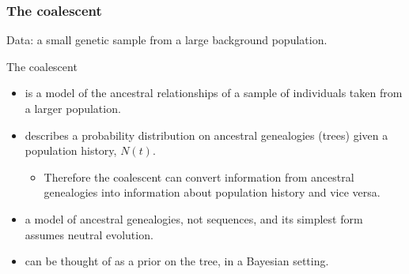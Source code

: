 
\begin{frame}
\frametitle{The coalescent}

Data: a \alert{small genetic sample} from a \alert{large background population}.

\smallskip 
\alert{The coalescent }
\begin{itemize}
\item is a model of the ancestral relationships of a sample of individuals taken from a larger population.
\smallskip
\item describes a probability distribution on ancestral genealogies (trees) given a population history, $N(t)$. 
  \begin{itemize}
	\item Therefore the coalescent can convert information from ancestral genealogies into information about population history and vice versa.
  \end{itemize}
\smallskip
\item a model of ancestral genealogies, not sequences, and its simplest form assumes neutral evolution.
\smallskip
\item can be thought of as a prior on the tree, in a Bayesian setting.
\end{itemize}

\end{frame}

